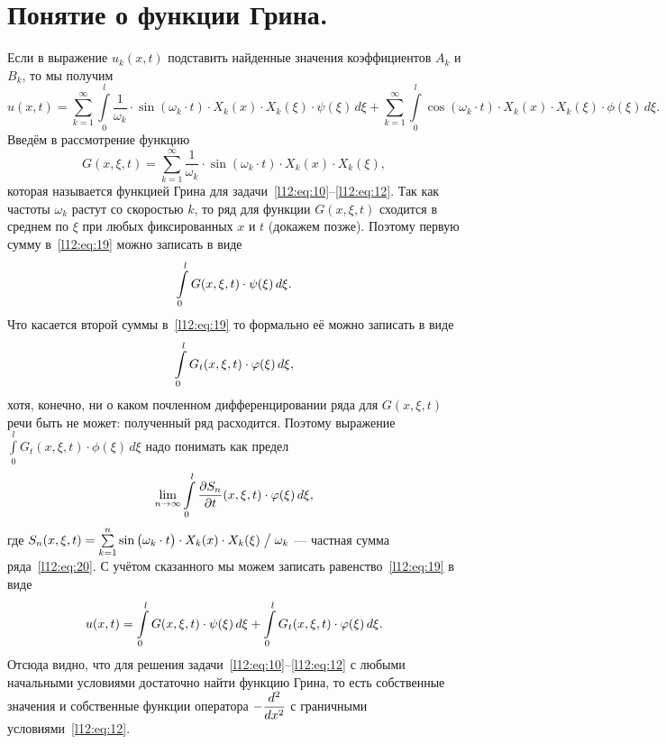 \section{Понятие о функции Грина.}
\label{lecture12section3}
Если в выражение $u_k(x,t)$ подставить найденные значения коэффициентов $A_k$ и  $B_k$, то мы получим
\begin{equation}
	\label{l12:eq:19}
	u(x,t)=\sum\limits_{k=1}^{\infty}\int\limits_0^l\frac{1}{\omega_k}\cdot\sin(\omega_k\cdot t)\cdot X_k(x)\cdot X_k(\xi)\cdot\psi(\xi)\,d\xi+ \sum\limits_{k=1}^{\infty}\int\limits_0^l\cos(\omega_k\cdot t)\cdot X_k(x)\cdot X_k(\xi)\cdot\phi(\xi)\,d\xi.
\end{equation}
Введём в рассмотрение функцию
\begin{equation}
	\label{l12:eq:20}
	 G(x,\xi,t)=\sum\limits_{k=1}^{\infty}\frac{1}{\omega_k}\cdot\sin(\omega_k\cdot t)\cdot X_k(x)\cdot X_k(\xi),
\end{equation}
которая называется функцией Грина для задачи~\eqref{l12:eq:10}--\eqref{l12:eq:12}. Так как частоты $\omega_k$ растут со скоростью $k$, то ряд для функции $G(x,\xi,t)$ сходится в среднем по $\xi$ при любых фиксированных $x$ и $t$ (докажем позже). Поэтому первую сумму в~\eqref{l12:eq:19} можно записать в виде 
\begin{equation*}
	\hfill\int\limits_0^l G(x,\xi,t)\cdot\psi(\xi)\,d\xi.\hfill
\end{equation*}
Что касается второй суммы в~\eqref{l12:eq:19} то формально её можно записать в виде 
\begin{equation*}
	\hfill\int\limits_0^l G_t(x,\xi,t)\cdot\phi(\xi)\,d\xi,\hfill
\end{equation*}
хотя, конечно, ни о каком почленном дифференцировании ряда для $G(x,\xi,t)$ речи быть не может: полученный ряд расходится. Поэтому выражение $\int\limits_0^l G_t(x,\xi,t)\cdot\phi(\xi)\,d\xi$ надо понимать как предел 
\begin{equation*}
	\hfill\lim\limits_{n\to\infty}\int\limits_0^l\pder{S_n}{t}(x,\xi,t)\cdot\phi(\xi)\,d\xi,\hfill
\end{equation*}
где $S_n(x,\xi,t)=\sum\limits_{k=1}^n\sin\big(\omega_k\cdot t\big)\cdot X_k(x)\cdot X_k(\xi)\bigm/\omega_k$ --- частная сумма ряда~\eqref{l12:eq:20}. С учётом сказанного мы можем записать равенство~\eqref{l12:eq:19} в виде
\begin{equation}
	\label{l12:eq:21}
	\hfill u(x,t)=\int\limits_0^l G(x,\xi,t)\cdot\psi(\xi)\,d\xi+\int\limits_0^l G_t(x,\xi,t)\cdot\phi(\xi)\,d\xi.\hfill
\end{equation}
Отсюда видно, что для решения задачи~\eqref{l12:eq:10}--\eqref{l12:eq:12} с любыми начальными условиями достаточно найти функцию Грина, то есть собственные значения и собственные функции оператора $-\displaystyle\frac{d^2}{dx^2}$ с граничными условиями~\eqref{l12:eq:12}.

